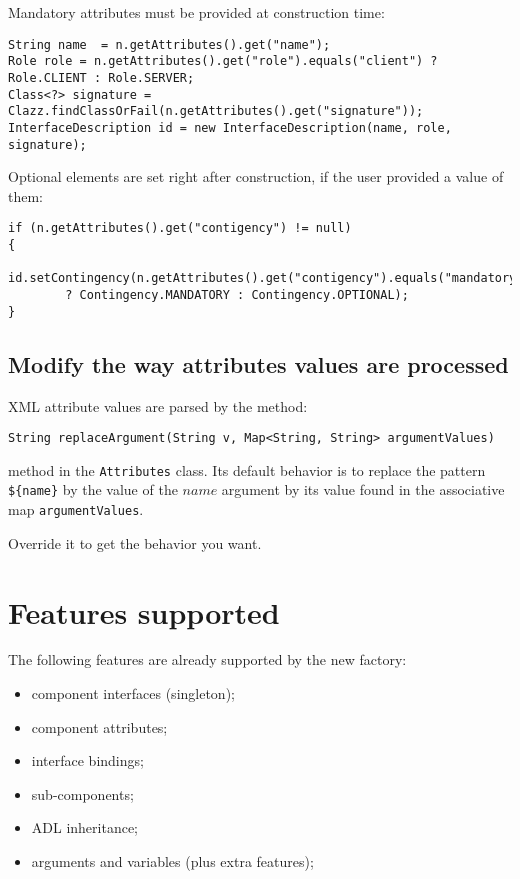 \documentclass{article}
\newcommand{\code}[1]{\texttt{#1}}
\begin{document}
Mandatory attributes must be provided at construction time:
\begin{tiny}
\begin{lstlisting}
String name  = n.getAttributes().get("name");
Role role = n.getAttributes().get("role").equals("client") ? Role.CLIENT : Role.SERVER;
Class<?> signature = Clazz.findClassOrFail(n.getAttributes().get("signature"));
InterfaceDescription id = new InterfaceDescription(name, role, signature);
\end{lstlisting}
\end{tiny}


Optional elements are set right after construction, if the user provided a value of them:
\begin{tiny}
\begin{lstlisting}
if (n.getAttributes().get("contigency") != null)
{
	id.setContingency(n.getAttributes().get("contigency").equals("mandatory")
		? Contingency.MANDATORY : Contingency.OPTIONAL);
}
\end{lstlisting}
\end{tiny}


\subsection{Modify the way attributes values are processed}

XML attribute values are parsed by the method:

\code{String replaceArgument(String v, Map<String, String> argumentValues)}

method in the \code{Attributes} class.
Its default behavior is to replace the pattern \code{\$\{name\}} by the value of the $name$ argument by its value
found in the associative map \code{argumentValues}.

Override it to get the behavior you want.



\section{Features supported}
The following features are already supported by the new factory:
\begin{itemize}
  \item component interfaces (singleton);
  \item component attributes;
  \item interface bindings;
  \item sub-components;
  \item ADL inheritance;
  \item arguments and variables (plus extra features);
\end{itemize}
\end{document}
